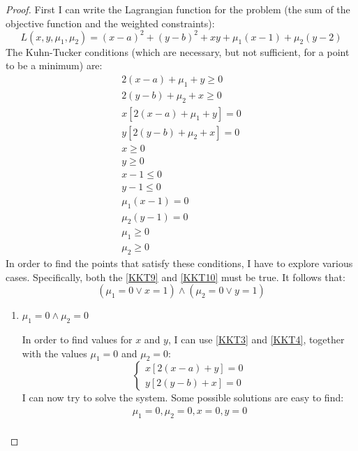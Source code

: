 \begin{proof}
    First I can write the Lagrangian function for the problem (the sum of the objective function and the weighted constraints):
    \[L(x,y,\mu_1,\mu_2) = (x-a)^2+(y-b)^2+xy + \mu_1(x-1) + \mu_2(y-2)\]
    The Kuhn-Tucker conditions (which are necessary, but not sufficient, for a point to be a minimum) are:
    \begin{gather}
        2(x-a) + \mu_1 + y \geq 0 \label{KKT1} \tag{KKT1} \\
        2(y-b) + \mu_2 + x \geq 0 \label{KKT2} \tag{KKT2} \\
        x[2(x-a) + \mu_1 + y] = 0 \label{KKT3} \tag{KTT3} \\
        y[2(y-b) + \mu_2 + x] = 0 \label{KKT4} \tag{KKT4} \\
        x \geq 0 \label{KKT5} \tag{KKT5} \\
        y \geq 0 \label{KKT6} \tag{KKT6} \\
        x - 1 \leq 0 \label{KKT7} \tag{KKT7} \\
        y - 1 \leq 0 \label{KKT8} \tag{KKT8} \\
        \mu_1(x - 1) = 0 \label{KKT9} \tag{KKT9} \\
        \mu_2(y - 1) = 0 \label{KKT10} \tag{KKT10} \\
        \mu_1 \geq 0 \label{KKT11} \tag{KKT11} \\
        \mu_2 \geq 0 \label{KKT12} \tag{KKT12} 
    \end{gather}
    In order to find the points that satisfy these conditions, I have to explore various cases. Specifically, both the \eqref{KKT9} and \eqref{KKT10} must be true. It follows that:
    \[(\mu_1 = 0 \lor x = 1) \land (\mu_2 = 0 \lor y = 1)\]
    \begin{enumerate}
        \item \(\mu_1 = 0 \land \mu_2 = 0\)\par
            In order to find values for \(x\) and \(y\), I can use \eqref{KKT3} and \eqref{KKT4}, together with the values \(\mu_1 = 0\) and \(\mu_2 = 0\):
            \[
                \begin{cases}
                    x[2(x-a) + y] = 0 \\
                    y[2(y-b) + x] = 0
                \end{cases}
            \]
            I can now try to solve the system. Some possible solutions are easy to find:
            \begin{gather}
                \mu_1 = 0, \mu_2 = 0, x = 0, y = 0 \label{SOL1} \tag{SOL1} \\

\end{gather}
\end{enumerate}
\end{proof}
